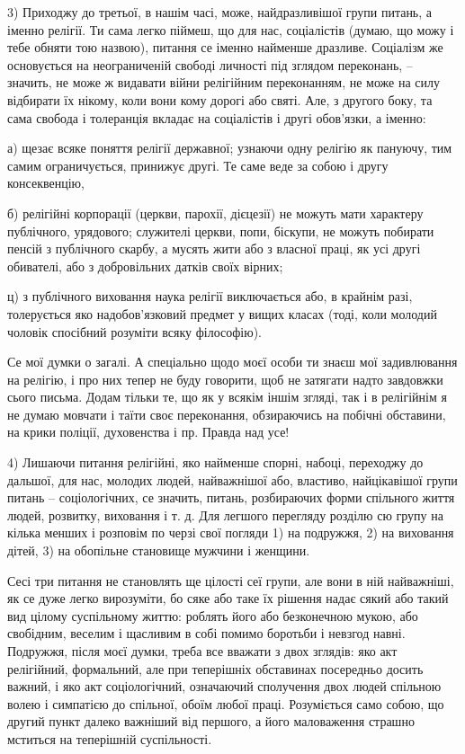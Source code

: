 3) Приходжу до третьої, в нашім часі, може, найдразливішої групи питань, а іменно релігії. Ти сама легко піймеш, що для нас, соціалістів (думаю, що можу і тебе обняти тою назвою), питання се іменно найменше дразливе. Соціалізм же основується на неограниченій свободі личності під зглядом переконань, – значить, не може ж видавати війни релігійним переконанням, не може на силу відбирати їх нікому, коли вони кому дорогі або святі. Але, з другого боку, та сама свобода і толеранція вкладає на соціалістів і другі обов’язки, а іменно:

а) щезає всяке поняття релігії державної; узнаючи одну релігію як пануючу, тим самим ограничується, принижує другі. Те саме веде за собою і другу консеквенцію,

б) релігійні корпорації (церкви, парохії, дієцезії) не можуть мати характеру публічного, урядового; служителі церкви, попи, біскупи, не можуть побирати пенсій з публічного скарбу, а мусять жити або з власної праці, як усі другі обивателі, або з добровільних датків своїх вірних;

ц) з публічного виховання наука релігії виключається або, в крайнім разі, толерується яко надобов’язковий предмет у вищих класах (тоді, коли молодий чоловік спосібний розуміти всяку філософію).

Се мої думки о загалі. А спеціально щодо моєї особи ти знаєш мої задивлювання на релігію, і про них тепер не буду говорити, щоб не затягати надто завдовжки сього письма. Додам тільки те, що як у всякім іншім згляді, так і в релігійнім я не думаю мовчати і таїти своє переконання, обзираючись на побічні обставини, на крики поліції, духовенства і пр. Правда над усе!

4) Лишаючи питання релігійні, яко найменше спорні, набоці, переходжу до
дальшої, для нас, молодих людей, найважнішої або, властиво, найцікавішої групи
питань – соціологічних, се значить, питань, розбираючих форми спільного життя
людей, розвитку, виховання і т. д. Для легшого перегляду розділю сю групу на
кілька менших і розповім по черзі свої погляди 1) на подружжя, 2) на виховання
дітей, 3) на обопільне становище мужчини і женщини.

Сесі три питання не становлять ще цілості сеї групи, але вони в ній найважніші,
як се дуже легко вирозуміти, бо сяке або таке їх рішення надає сякий або такий
вид цілому суспільному життю: роблять його або безконечною мукою, або
свобідним, веселим і щасливим в собі помимо боротьби і невзгод навні. Подружжя,
після моєї думки, треба все вважати з двох зглядів: яко акт релігійний,
формальний, але при теперішніх обставинах посередньо досить важний, і яко акт
соціологічний, означаючий сполучення двох людей спільною волею і симпатією до
спільної, обоїм любої праці. Розуміється само собою, що другий пункт далеко
важніший від першого, а його маловаження страшно мститься на теперішній
суспільності.

